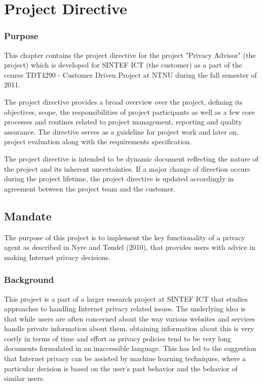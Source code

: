  

\chapter{Project Directive}
\label{directive}
\minitoc

\subsection*{Purpose}
This chapter contains the project directive for the project "Privacy Advisor" (the project) which is developed for SINTEF ICT (the customer) as a part of the course TDT4290 - Customer Driven Project at NTNU during the fall semester of 2011.

The project directive provides a broad overview over the project, defining its objectives, scope, the responsibilities of project participants as well as a few core processes and routines related to project management, reporting and quality assurance. The directive serves as a guideline for project work and later on, project evaluation along with the requirements specification.

The project directive is intended to be dynamic document reflecting the nature of the project and its inherent uncertainties. If a major change of direction occurs during the project lifetime, the project directive is updated accordingly in agreement between the project team and the customer.

\section{Mandate}
The purpose of this project is to implement the key functionality of a privacy agent as described in Nyre and T{\o}ndel (2010), that provides users with advice in making Internet privacy decisions. 

\subsection{Background}
This project is a part of a larger research project at SINTEF ICT that studies approaches to handling Internet privacy related issues. The underlying idea is that while users are often concerned about the way various websites and services handle private information about them, obtaining information about this is very costly in terms of time and effort as privacy policies tend to be very long documents formulated in an inaccessible language. This has led to the suggestion that Internet privacy can be assisted by machine learning techniques, where a particular decision is based on the user's past behavior and the behavior of similar users.

